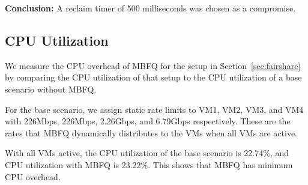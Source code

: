 {\bf Conclusion:}  A reclaim timer of 500 milliseconds was chosen as a 
compromise. 

\subsection{CPU Utilization}
\label{sec:utilization}

We measure the CPU overhead of MBFQ for the setup in Section~\ref{sec:fairshare}
by comparing the CPU utilization of that setup to the CPU utilization of a base scenario
without MBFQ.  

For the base scenario, we assign static rate limits to VM1, VM2, VM3, and VM4
with 226Mbps, 226Mbps, 2.26Gbps, and 6.79Gbps respectively.  These are the rates
that MBFQ dynamically distributes  to the VMs when all VMs are active.

With all VMs active, the CPU utilization of the base scenario is 22.74\%, and CPU utilization
with MBFQ is 23.22\%. This shows that MBFQ has minimum CPU overhead.
